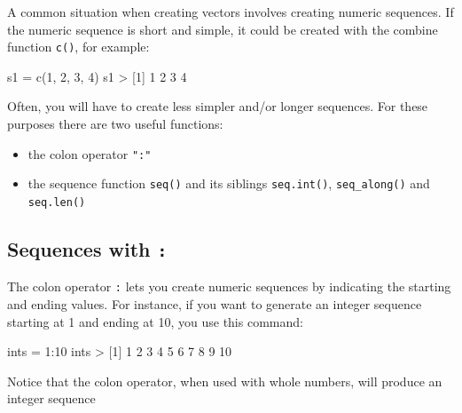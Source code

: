 \documentclass[
]{book}
\newenvironment{Shaded}{\begin{snugshade}}{\end{snugshade}}
\newcommand{\DecValTok}[1]{\textcolor[rgb]{0.00,0.00,0.81}{#1}}
\newcommand{\FunctionTok}[1]{\textcolor[rgb]{0.00,0.00,0.00}{#1}}
\newcommand{\NormalTok}[1]{#1}
\newcommand{\OtherTok}[1]{\textcolor[rgb]{0.56,0.35,0.01}{#1}}
\newcommand{\SpecialCharTok}[1]{\textcolor[rgb]{0.00,0.00,0.00}{#1}}
\begin{document}
A common situation when creating vectors involves creating numeric sequences.
If the numeric sequence is short and simple, it could be created with the
combine function \texttt{c()}, for example:

\begin{Shaded}
\begin{Highlighting}[]
\NormalTok{s1 }\OtherTok{=} \FunctionTok{c}\NormalTok{(}\DecValTok{1}\NormalTok{, }\DecValTok{2}\NormalTok{, }\DecValTok{3}\NormalTok{, }\DecValTok{4}\NormalTok{)}
\NormalTok{s1}
\SpecialCharTok{\textgreater{}}\NormalTok{ [}\DecValTok{1}\NormalTok{] }\DecValTok{1} \DecValTok{2} \DecValTok{3} \DecValTok{4}
\end{Highlighting}
\end{Shaded}

Often, you will have to create less simpler and/or longer sequences. For these
purposes there are two useful functions:

\begin{itemize}
\item
  the colon operator \texttt{":"}
\item
  the sequence function \texttt{seq()} and its siblings \texttt{seq.int()}, \texttt{seq\_along()}
  and \texttt{seq.len()}
\end{itemize}

\hypertarget{sequences-with}{%
\subsection{\texorpdfstring{Sequences with \texttt{:}}{Sequences with :}}\label{sequences-with}}

The colon operator \texttt{:} lets you create numeric sequences by indicating the
starting and ending values. For instance, if you want to generate an integer
sequence starting at 1 and ending at 10, you use this command:

\begin{Shaded}
\begin{Highlighting}[]
\NormalTok{ints }\OtherTok{=} \DecValTok{1}\SpecialCharTok{:}\DecValTok{10}
\NormalTok{ints}
\SpecialCharTok{\textgreater{}}\NormalTok{  [}\DecValTok{1}\NormalTok{]  }\DecValTok{1}  \DecValTok{2}  \DecValTok{3}  \DecValTok{4}  \DecValTok{5}  \DecValTok{6}  \DecValTok{7}  \DecValTok{8}  \DecValTok{9} \DecValTok{10}
\end{Highlighting}
\end{Shaded}

Notice that the colon operator, when used with whole numbers, will produce
an integer sequence
\end{document}
